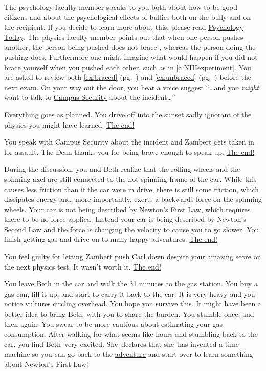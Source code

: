 \documentclass[11pt,letter,openany,makeidx]{book}
\newcounter{storyline}
\renewcommand{\thestoryline}{Storyline \arabic{storyline}}
\newenvironment{Story}{\begin{list}{\textbf{\thestoryline}:}{\usecounter{storyline} \leftmargin 12pt}}{\end{list}}
\newcommand{\studentB}{Beth}        \newcommand{\massB}{\mbox{$75.0\unit{kg}$}}
\newcommand{\studentC}{Carl}        \newcommand{\massC}{\mbox{$90.0\unit{kg}$}}
\newcommand{\studentZ}{Zambert}     \newcommand{\massZ}{\mbox{$95.0\unit{kg}$}}
\newcommand{\heB}{she}\newcommand{\himB}{her}\newcommand{\hisB}{her}\newcommand{\himselfB}{herself}
\newcommand{\HeB}{She}\newcommand{\HimB}{Her}\newcommand{\HisB}{Her}
\begin{document}
\begin{Story}
\item\label{a:NIIIfaculty} The psychology faculty member speaks to you both about how to be good citizens and about the psychological effects of bullies both on the bully and on the recipient.  If you decide to learn more about this, please read \href{https://www.psychologytoday.com/basics/bullying}{Psychology Today}.  The physics faculty member points out that when one person pushes another, the person being pushed does not brace \himselfC, whereas the person doing the pushing does.  Furthermore one might imagine what would happen if you did not brace yourself when you pushed each other, such as in \ref{a:NIIIexperiment}.  You are asked to review both \autoref{ex:braced}  (pg.~\pageref{ex:braced}) and \autoref{ex:unbraced}  (pg.~\pageref{ex:unbraced}) before the next exam.  On your way out the door, you hear a voice suggest ``\ldots and you \textit{might} want to talk to \hyperref[a:NIIIsecurity]{Campus Security} about the incident\ldots''
\item\label{a:intosunset} Everything goes as planned.  You drive off into the sunset sadly ignorant of the physics you might have learned. \hyperref[cyoa:NI]{The end!}
\item\label{a:NIIIsecurity} You speak with Campus Security about the incident and \studentZ\index{\studentZ} gets taken in for assault.  The Dean thanks you for being brave enough to speak up. \hyperref[cyoa:NIII]{The end!}
\item\label{a:NIresult} During the discussion, you and \studentB\index{\studentB} realize that the rolling wheels and the spinning axel are still connected to the not-spinning frame of the car.  While this causes less friction than if the car were in drive, there is still some friction, which dissipates energy and, more importantly, exerts a backwards force on the spinning wheels.  Your car is not being described by Newton's First Law, which requires there to be no force applied.  Instead your car is being described by Newton's Second Law and the force is changing the velocity to cause you to go slower.  You finish getting gas and drive on to many happy adventures. \hyperref[cyoa:NI]{The end!}
\item\label{a:guilty} You feel guilty for letting \studentZ\index{\studentZ} push \studentC\index{\studentC} down despite your amazing score on the next physics test.  It wasn't worth it.  \hyperref[cyoa:NIII]{The end!}
\item\label{a:nogas2} You leave \studentB\index{\studentB} in the car and walk the 31 minutes to the gas station.  You buy a gas can, fill it up, and start to carry it back to the car.  It is very heavy and you notice vultures circling overhead.  You hope you survive this.  It might have been a better idea to bring \studentB\ with you to share the burden.  You stumble once, and then again.  You swear to be more cautious about estimating your gas consumption.  After walking for what seems like hours and stumbling back to the car, you find \studentB\ very excited. \HeB\ declares that \heB\ has invented a time machine so you can go back to the \hyperref[cyoa:NI]{adventure} and start over to learn something about Newton's First Law!

\end{Story}
\end{document}
